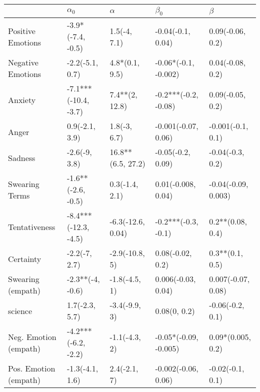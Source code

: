 \begin{tabular}{lllll}
\toprule
{} &            $\alpha_0$ &           $\alpha$ &              $\beta_0$ &              $\beta$ \\
\midrule
Positive Emotions     &     -3.9*(-7.4, -0.5) &       1.5(-4, 7.1) &      -0.04(-0.1, 0.04) &     0.09(-0.06, 0.2) \\
Negative Emotions     &       -2.2(-5.1, 0.7) &     4.8*(0.1, 9.5) &   -0.06*(-0.1, -0.002) &     0.04(-0.08, 0.2) \\
Anxiety               &  -7.1***(-10.4, -3.7) &     7.4**(2, 12.8) &   -0.2***(-0.2, -0.08) &     0.09(-0.05, 0.2) \\
Anger                 &        0.9(-2.1, 3.9) &       1.8(-3, 6.7) &    -0.001(-0.07, 0.06) &    -0.001(-0.1, 0.1) \\
Sadness               &         -2.6(-9, 3.8) &  16.8**(6.5, 27.2) &      -0.05(-0.2, 0.09) &     -0.04(-0.3, 0.2) \\
Swearing Terms        &    -1.6**(-2.6, -0.5) &     0.3(-1.4, 2.1) &     0.01(-0.008, 0.04) &  -0.04(-0.09, 0.003) \\
Tentativeness         &  -8.4***(-12.3, -4.5) &  -6.3(-12.6, 0.04) &    -0.2***(-0.3, -0.1) &     0.2**(0.08, 0.4) \\
Certainty             &         -2.2(-7, 2.7) &     -2.9(-10.8, 5) &       0.08(-0.02, 0.2) &      0.3**(0.1, 0.5) \\
Swearing (empath)     &      -2.3**(-4, -0.6) &      -1.8(-4.5, 1) &     0.006(-0.03, 0.04) &   0.007(-0.07, 0.08) \\
science               &        1.7(-2.3, 5.7) &      -3.4(-9.9, 3) &           0.08(0, 0.2) &     -0.06(-0.2, 0.1) \\
Neg. Emotion (empath) &   -4.2***(-6.2, -2.2) &      -1.1(-4.3, 2) &  -0.05*(-0.09, -0.005) &    0.09*(0.005, 0.2) \\
Pos. Emotion (empath) &       -1.3(-4.1, 1.6) &       2.4(-2.1, 7) &    -0.002(-0.06, 0.06) &     -0.02(-0.1, 0.1) \\
\bottomrule
\end{tabular}
